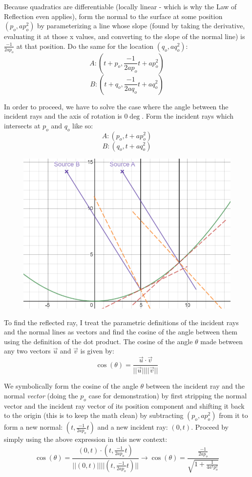 \documentclass[10pt]{article}
\begin{document}
Because quadratics are differentiable (locally linear - which is why the Law of Reflection even applies), form the normal to the surface at some position $(p_o,ap_o^2)$ by parameterizing a line whose slope (found by taking the derivative, evaluating it at those x values, and converting to the slope of the normal line) is $\frac{-1}{2ap_o}$ at that position. Do the same for the location $(q_o,aq_o^2)$:
$$A:\left(t+p_{o},\frac{-1}{2ap_{o}}t+ap_{o}^{2}\right)$$
$$B:\left(t+q_{o},\frac{-1}{2aq_{o}}t+aq_{o}^{2}\right)$$

In order to proceed, we have to solve the case where the angle between the incident rays and the axis of rotation is $0\deg$. Form the incident rays which intersects at $p_o$ and $q_o$ like so:
$$A:\left(p_{o},t+ap_{o}^{2}\right)$$
$$B:\left(q_{o},t+aq_{o}^{2}\right)$$

\begin{figure}[h]
\centering{}
\includegraphics[scale=0.3]{pinc}
\end{figure}

To find the reflected ray, I treat the parametric definitions of the incident rays and the normal lines as vectors and find the cosine of the angle between them using the definition of the dot product. The cosine of the angle $\theta$ made between any two vectors $\vec{u}$ and $\vec{v}$ is given by:
$$\cos(\theta) = \frac{\vec{u}\cdot \vec{v}}{||\vec{u}||||\vec{v}||}$$

We symbolically form the cosine of the angle $\theta$ between the incident ray and the normal \textit{vector} (doing the $p_o$ case for demonstration) by first stripping the normal vector and the incident ray vector of its position component and shifting it back to the origin (this is to keep the math clean) by subtracting $(p_o,ap_o^2)$ from it to form a new normal: $\left(t,\frac{-1}{2ap_{o}}t\right)$ and a new incident ray: $\left(0,t\right)$. Proceed by simply using the above expression in this new context:
$$\cos(\theta)=\frac{\left(0,t\right)\cdot\left(t,\frac{-1}{2ap_{o}}t\right)}{||\left(0,t\right)||||\left(t,\frac{-1}{2ap_{o}}t\right)||} \to \cos(\theta)=\frac{\frac{-1}{2ap_{o}}}{\sqrt{1+\frac{1}{4a^2p_{o}^2}}}$$
\end{document}
